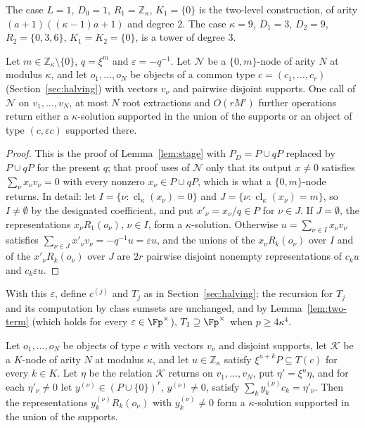 The case $L = 1$, $D_0 = 1$, $R_1 = \mathbb{Z}_\kappa$, $K_1 = \{0\}$ is the two-level construction, of arity $(a+1)((\kappa-1)a+1)$ and degree $2$. The case $\kappa = 9$, $D_1 = 3$, $D_2 = 9$, $R_2 = \{0,3,6\}$, $K_1 = K_2 = \{0\}$, is a tower of degree $3$.

\begin{lemma}
\label{lem:stage2}
Let $m \in \mathbb{Z}_\kappa\setminus\{0\}$, $q = \xi^m$ and $\varepsilon = -q^{-1}$. Let $\mathcal N$ be a $\{0,m\}$-node of arity $N$ at modulus $\kappa$, and let $o_1,\dots,o_N$ be objects of a common type $c = (c_1,\dots,c_r)$ (Section~\ref{sec:halving}) with vectors $v_\nu$ and pairwise disjoint supports. One call of $\mathcal N$ on $v_1,\dots,v_N$, at most $N$ root extractions and $O(rM')$ further operations return either a $\kappa$-solution supported in the union of the supports or an object of type $(c,\varepsilon c)$ supported there.
\end{lemma}

\begin{proof}
This is the proof of Lemma~\ref{lem:stage} with $P_D = P \cup qP$ replaced by $P \cup qP$ for the present $q$; that proof uses of $\mathcal N$ only that its output $x \ne 0$ satisfies $\sum_\nu x_\nu v_\nu = 0$ with every nonzero $x_\nu \in P \cup qP$, which is what a $\{0,m\}$-node returns. In detail: let $I = \{\nu : \operatorname{cl}_\kappa(x_\nu) = 0\}$ and $J = \{\nu : \operatorname{cl}_\kappa(x_\nu) = m\}$, so $I \ne \emptyset$ by the designated coefficient, and put $x'_\nu = x_\nu/q \in P$ for $\nu \in J$. If $J = \emptyset$, the representations $x_\nu R_1(o_\nu)$, $\nu \in I$, form a $\kappa$-solution. Otherwise $u = \sum_{\nu\in I}x_\nu v_\nu$ satisfies $\sum_{\nu\in J}x'_\nu v_\nu = -q^{-1}u = \varepsilon u$, and the unions of the $x_\nu R_k(o_\nu)$ over $I$ and of the $x'_\nu R_k(o_\nu)$ over $J$ are $2r$ pairwise disjoint nonempty representations of $c_ku$ and $c_k\varepsilon u$.
\end{proof}

With this $\varepsilon$, define $c^{(j)}$ and $T_j$ as in Section~\ref{sec:halving}; the recursion for $T_j$ and its computation by class sumsets are unchanged, and by Lemma~\ref{lem:two-term} (which holds for every $\varepsilon \in \Fp^\times$), $T_1 \supseteq \Fp^\times$ when $p \ge 4\kappa^4$.

\begin{lemma}
\label{lem:finishK}
Let $o_1,\dots,o_N$ be objects of type $c$ with vectors $v_\nu$ and disjoint supports, let $\mathcal K$ be a $K$-node of arity $N$ at modulus $\kappa$, and let $u \in \mathbb{Z}_\kappa$ satisfy $\xi^{u+k}P \subseteq T(c)$ for every $k \in K$. Let $\eta$ be the relation $\mathcal K$ returns on $v_1,\dots,v_N$, put $\eta' = \xi^u\eta$, and for each $\eta'_\nu \ne 0$ let $y^{(\nu)} \in (P\cup\{0\})^r$, $y^{(\nu)} \ne 0$, satisfy $\sum_ky^{(\nu)}_kc_k = \eta'_\nu$. Then the representations $y^{(\nu)}_kR_k(o_\nu)$ with $y^{(\nu)}_k \ne 0$ form a $\kappa$-solution supported in the union of the supports.
\end{lemma}

